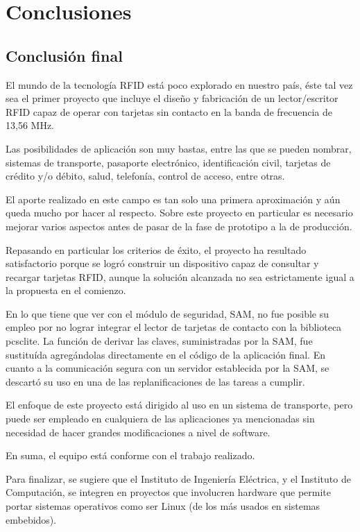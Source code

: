 \chapter{Conclusiones}

\section{Conclusión final}
El mundo de la tecnología RFID está poco explorado en nuestro país, éste 
tal vez sea el primer proyecto que incluye el diseño y fabricación de un 
lector/escritor RFID capaz de operar con tarjetas sin contacto en la banda de
frecuencia de 13,56 MHz.

Las posibilidades de aplicación son muy bastas, entre las que se pueden 
nombrar, sistemas de transporte, pasaporte electrónico, identificación 
civil, tarjetas de crédito y/o débito, salud, telefonía, control de acceso,
entre otras.

El aporte realizado en este campo es tan solo una primera aproximación y aún 
queda mucho por hacer al respecto. Sobre este proyecto en particular es
necesario mejorar varios aspectos antes de pasar de la fase de prototipo
a la de producción.

\bigskip
Repasando en particular los criterios de éxito, el proyecto ha resultado satisfactorio
porque se logró construir un dispositivo capaz de consultar y recargar tarjetas RFID,
aunque la solución alcanzada no sea estrictamente igual a la propuesta en el comienzo.

\bigskip
En lo que tiene que ver con el módulo de seguridad, SAM, no fue posible su empleo 
por no lograr integrar el lector de tarjetas de contacto con la biblioteca pcsclite.
La función de derivar las claves, suministradas por la SAM, fue sustituída agregándolas
directamente en el código de la aplicación final. En cuanto a la comunicación
segura con un servidor establecida por la SAM, se descartó su uso en una de 
las replanificaciones de las tareas a cumplir.

\bigskip
El enfoque de este proyecto está dirigido al uso en un sistema de transporte, pero 
puede ser empleado en cualquiera de las aplicaciones ya mencionadas sin necesidad
de hacer grandes modificaciones a nivel de software.

\bigskip
En suma, el equipo está conforme con el trabajo realizado.

\bigskip
Para finalizar, se sugiere que el Instituto de Ingeniería Eléctrica, y el Instituto de Computación, se integren en proyectos que involucren hardware que permite portar sistemas operativos como ser Linux (de los más usados en sistemas embebidos).

